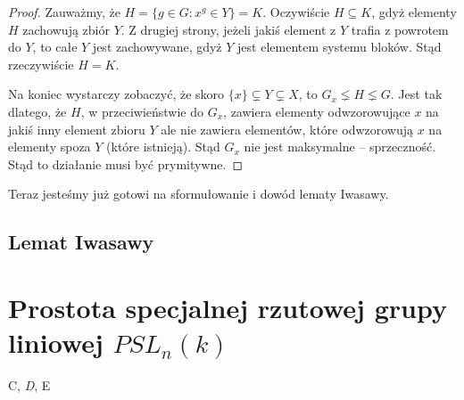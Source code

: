 \documentclass[licencjacka]{pracamgr}
\begin{document}
\begin{proof}
Zauważmy, że $H = \{ g \in G \colon x^g \in Y\} = K$. 
Oczywiście $H \subseteq K$, gdyż elementy $H$ zachowują zbiór $Y$.
Z drugiej strony, jeżeli jakiś element z $Y$ trafia z powrotem do $Y$, to całe $Y$ jest zachowywane, 
gdyż $Y$ jest elementem systemu bloków.
Stąd rzeczywiście $H = K$.

Na koniec wystarczy zobaczyć, że skoro $\{x\} \subsetneq  Y \subsetneq X$,
to $G_x \lneq H \lneq G$.
Jest tak dlatego, że $H$, w przeciwieństwie do $G_x$, zawiera elementy odwzorowujące $x$ na jakiś inny element zbioru $Y$
ale nie zawiera elementów, które odwzorowują $x$ na elementy spoza $Y$ (które istnieją).
Stąd $G_x$ nie jest maksymalne -- sprzeczność.
Stąd to działanie musi być prymitywne.
\end{proof}

Teraz jesteśmy już gotowi na sformułowanie i dowód lematy Iwasawy.

\section{Lemat Iwasawy}


\chapter{Prostota specjalnej rzutowej grupy liniowej $PSL_n(k)$}


\begin{thebibliography}{99}

 C, \textit{D}, E


\end{thebibliography}
\end{document}

